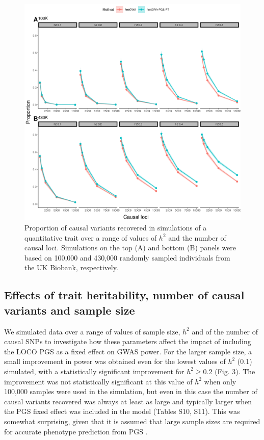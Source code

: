 \documentclass[fleqn,10pt]{wlscirep}
\begin{document}
\begin{figure}
\centering
\includegraphics[width=120mm]{images/variable_param_alt}
\caption{Proportion of causal variants recovered in simulations of a quantitative trait over a range of values of $h^2$ and the number of causal loci. Simulations on the top (A) and bottom (B) panels were based on 100,000 and 430,000 randomly sampled individuals from the UK Biobank, respectively.}
\label{fig:variable param}
\end{figure}



\par

\par
\subsection*{Effects of trait heritability, number of causal variants and sample size} 
We simulated data over a range of values of sample size, $h^2$ and of the number of causal SNPs to investigate how these parameters affect the impact of including the LOCO PGS as a fixed effect on GWAS power. For the larger sample size, a small improvement in power was obtained even for the lowest values of $h^2$ (0.1) simulated, with a statistically significant improvement for $h^2 \geq 0.2$ (Fig. 3). The improvement was not statistically significant at this value of $h^2$ when only 100,000 samples were used in the simulation, but even in this case the number of causal variants recovered was always at least as large and typically larger when the PGS fixed effect was included in the model (Tables S10, S11). This was somewhat surprising, given that it is assumed that large sample sizes are required for accurate phenotype prediction from PGS \cite{dudbridge2013power}. 
\end{document}
